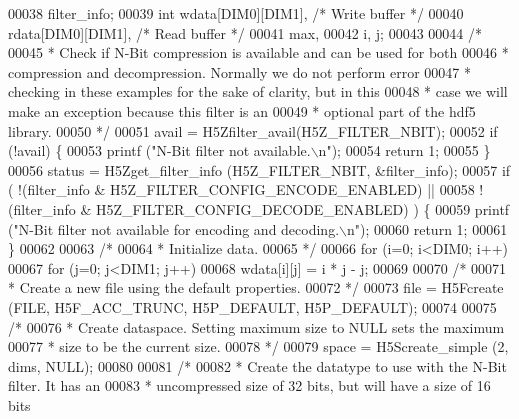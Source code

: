 \begin{DoxyCode}
00038                     filter\_info;
00039     \textcolor{keywordtype}{int}             wdata[DIM0][DIM1],          \textcolor{comment}{/* Write buffer */}
00040                     rdata[DIM0][DIM1],          \textcolor{comment}{/* Read buffer */}
00041                     max,
00042                     i, j;
00043 
00044     \textcolor{comment}{/*}
00045 \textcolor{comment}{     * Check if N-Bit compression is available and can be used for both}
00046 \textcolor{comment}{     * compression and decompression.  Normally we do not perform error}
00047 \textcolor{comment}{     * checking in these examples for the sake of clarity, but in this}
00048 \textcolor{comment}{     * case we will make an exception because this filter is an}
00049 \textcolor{comment}{     * optional part of the hdf5 library.}
00050 \textcolor{comment}{     */}
00051     avail = H5Zfilter\_avail(H5Z\_FILTER\_NBIT);
00052     \textcolor{keywordflow}{if} (!avail) \{
00053         printf (\textcolor{stringliteral}{"N-Bit filter not available.\(\backslash\)n"});
00054         \textcolor{keywordflow}{return} 1;
00055     \}
00056     status = H5Zget\_filter\_info (H5Z\_FILTER\_NBIT, &filter\_info);
00057     \textcolor{keywordflow}{if} ( !(filter\_info & H5Z\_FILTER\_CONFIG\_ENCODE\_ENABLED) ||
00058                 !(filter\_info & H5Z\_FILTER\_CONFIG\_DECODE\_ENABLED) ) \{
00059         printf (\textcolor{stringliteral}{"N-Bit filter not available for encoding and decoding.\(\backslash\)n"});
00060         \textcolor{keywordflow}{return} 1;
00061     \}
00062 
00063     \textcolor{comment}{/*}
00064 \textcolor{comment}{     * Initialize data.}
00065 \textcolor{comment}{     */}
00066     \textcolor{keywordflow}{for} (i=0; i<DIM0; i++)
00067         \textcolor{keywordflow}{for} (j=0; j<DIM1; j++)
00068             wdata[i][j] = i * j - j;
00069 
00070     \textcolor{comment}{/*}
00071 \textcolor{comment}{     * Create a new file using the default properties.}
00072 \textcolor{comment}{     */}
00073     file = H5Fcreate (FILE, H5F\_ACC\_TRUNC, H5P\_DEFAULT, H5P\_DEFAULT);
00074 
00075     \textcolor{comment}{/*}
00076 \textcolor{comment}{     * Create dataspace.  Setting maximum size to NULL sets the maximum}
00077 \textcolor{comment}{     * size to be the current size.}
00078 \textcolor{comment}{     */}
00079     space = H5Screate\_simple (2, dims, NULL);
00080 
00081     \textcolor{comment}{/*}
00082 \textcolor{comment}{     * Create the datatype to use with the N-Bit filter.  It has an}
00083 \textcolor{comment}{     * uncompressed size of 32 bits, but will have a size of 16 bits}

\end{DoxyCode}
